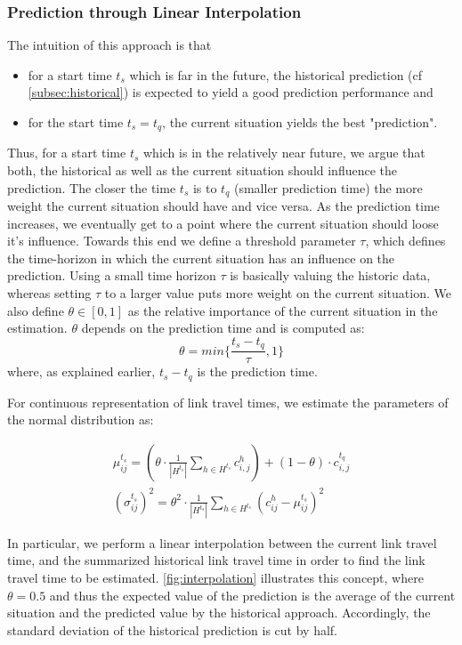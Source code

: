 \subsubsection{Prediction through Linear Interpolation}
\label{subsec:LI}
The intuition of this approach is that 
\begin{itemize}
  \item for a start time $t_s$ which is far in the future, the historical prediction (cf \cref{subsec:historical}) is expected to yield a good prediction performance and
\item for the start time $t_s = t_q$, the current situation yields the best "prediction".
\end{itemize}

Thus, for a start time $t_s$ which is in the relatively near future, we argue that both, the historical as well as the current situation should influence the prediction. The closer the time $t_s$ is to $t_q$ (smaller prediction time) the more weight the current situation should have and vice versa. As the prediction time increases, we eventually get to a point where the current situation should loose it's influence. Towards this end we define a threshold parameter $\tau$, which defines the time-horizon in which the current situation has an influence on the prediction. Using a small time horizon $\tau$ is basically valuing the historic data, whereas setting $\tau$ to a larger value puts more weight on the current situation. We also define $\theta \in [0,1]$ as the relative importance of the current situation in the estimation. $\theta$ depends on the prediction time and is computed as:
\begin{equation}
\theta = min \{\frac{t_s-t_q}{\tau}, 1 \}
\end{equation}
where, as explained earlier, $t_s-t_q$ is the prediction time.

For continuous representation of link travel times, we estimate the parameters of the normal distribution as:

\begin{gather}
	\mu_{ij}^{t_s} = \left(\theta\cdot\frac{1}{|H^{t_s}|}\sum_{h\in H^{t_s}} c_{i,j}^h \right)
	+ \left(1-\theta\right)\cdot c_{i,j}^{t_q}\\
	(\sigma_{ij}^{t_s})^2 = \theta^2 \cdot \frac{1}{|H^{t_s}|}\sum_{h\in H^{t_s}}
	(c_{ij}^h-\mu_{ij}^{t_s})^2
\end{gather}

In particular, we perform a linear interpolation between the current link travel time, and the summarized historical link travel time in order to find the link travel time to be estimated. \cref{fig:interpolation} illustrates this concept, where  $\theta = 0.5$ and thus the expected value of the prediction is the average of the current situation and the predicted value by the historical approach. Accordingly, the standard deviation of the historical prediction is cut by half.

